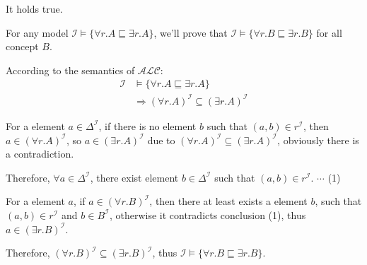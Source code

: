 \documentclass[12pt]{article}
\def \I {\mathcal{I}}
\begin{document}
    It holds true. \par
    For any model $ \mathcal{I} \models \{\forall r.A \sqsubseteq \exists r.A\} $, we'll prove that $ \mathcal{I} \models \{\forall r.B \sqsubseteq \exists r.B\} $ for all concept $B$.\par
    According to the semantics of $\mathcal{ALC}$:
    \begin{align*}
        \I & \models \{\forall r.A \sqsubseteq \exists r.A\} \\
        & \Rightarrow (\forall r.A)^{\mathcal{I}} \subseteq (\exists r.A)^{\mathcal{I}} 
    \end{align*} \par
    For a element $a \in \Delta^{\I}$, if there is no element $b$ such that $(a, b) \in r^{\I}$, then $a \in (\forall r.A)^{\I}$, so $a \in (\exists r.A)^{\I}$ due to $(\forall r.A)^{\mathcal{I}} \subseteq (\exists r.A)^{\mathcal{I}}$, obviously there is a contradiction. \par
    Therefore, $\forall a \in \Delta^{\I}$, there exist element $b \in \Delta^{\I}$ such that $(a, b) \in r^{\I}$. $\cdots$ (1)\par
    For a element $a$, if $a \in (\forall r.B)^{\I}$, then there at least exists a element $b$, such that $(a, b) \in r^{\I}$ and $b \in B^{\I}$, otherwise it contradicts conclusion (1), thus $a \in (\exists r.B)^{\I}$. \par
    Therefore, $(\forall r.B)^{\mathcal{I}} \subseteq (\exists r.B)^{\mathcal{I}}$, thus $ \mathcal{I} \models \{\forall r.B \sqsubseteq \exists r.B\} $.




    \newpage
\end{document}
